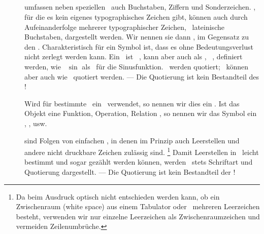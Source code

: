 
\subsection[Bezeichnungen]{\Bezeichnungen}%
\label {sub:Bezeichnungen}

\begin{description}

	\item [\Symbole] umfassen neben speziellen \Symbolen\ auch Buchstaben, Ziffern und Sonderzeichen.
	\Symbole, für die es kein eigenes typographisches Zeichen gibt, können auch durch Aufeinanderfolge mehrerer typographischer Zeichen, \textiAlg\ lateinische Buchstaben, dargestellt werden.
	Wir nennen sie dann , im Gegensatz zu den .
	Charakteristisch für ein Symbol ist, dass es ohne Bedeutungsverlust nicht zerlegt werden kann.
	Ein \zusammengesetztesSymbol\ ist \textiAlg\ \zerlegbar, kann aber auch als \atomar, \textdh\ \unzerlegbar, definiert werden, wie \textzB\ $\sin$ als \Symbol\ für die Sinusfunktion.
	\Symbole\ werden  quotiert; \zerlegbare\ können aber auch wie \Symbolfolgen\ quotiert werden.
	--- Die Quotierung ist kein Bestandteil des \Symbols!

	Wird für bestimmte \Objekte\ ein \Symbol\ verwendet, so nennen wir dies ein .
	Ist das Objekt eine Funktion, Operation, Relation \textusw, so nennen wir das Symbol ein , ,  usw.

	\item [\Zeichenketten] sind Folgen von einfachen \Symbolen, in denen im Prinzip auch Leerstellen und andere nicht druckbare Zeichen zulässig sind.%
	\footnote{%
		Da beim Ausdruck optisch nicht entschieden werden kann, ob ein Zwischenraum (white space) aus einem Tabulator oder \textevtl\ mehreren Leerzeichen besteht, verwenden wir nur einzelne Leerzeichen als Zwischenraumzeichen und vermeiden Zeilenumbrüche.
	}
	Damit Leerstellen in \Zeichenketten\ leicht bestimmt und sogar gezählt werden können,
	werden \Zeichenketten\ stets  Schriftart und Quotierung dargestellt.
	--- Die Quotierung ist kein Bestandteil der \Zeichenkette!


\end{description}

